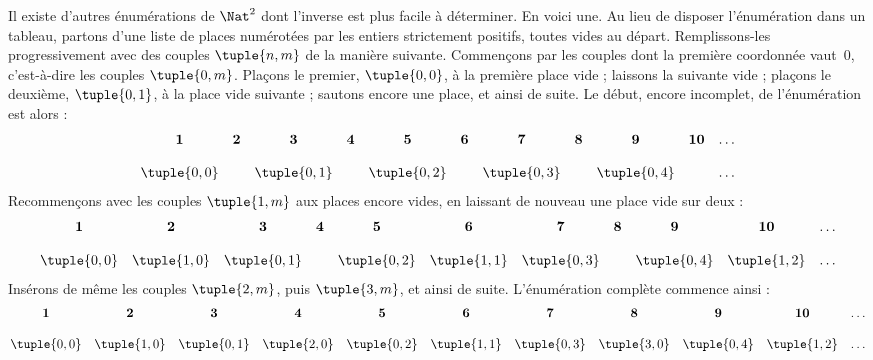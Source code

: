 \documentclass[../../../include/open-logic-section]{subfiles}
\begin{document}


\begin{explain}
Il existe d’autres énumérations de $\Nat^2$ dont l’inverse est
plus facile à déterminer. En voici une. Au lieu de disposer
l’énumération dans un tableau, partons d’une liste de places
numérotées par les entiers strictement positifs, toutes vides
au départ. Remplissons-les progressivement avec des couples
$\tuple{n,m}$ de la manière suivante. Commençons par les couples
dont la première coordonnée vaut~$0$, c’est-à-dire les couples
$\tuple{0,m}$. Plaçons le premier, $\tuple{0,0}$, à la première
place vide ; laissons la suivante vide ; plaçons le deuxième,
$\tuple{0,1}$, à la place vide suivante ; sautons encore une
place, et ainsi de suite.
%
%
Le début, encore incomplet, de l’énumération est alors :
{\small\[
\begin{array}{@{}c c c c c c c c c c c@{}}
\mathbf 1 & \mathbf 2 & \mathbf 3 & \mathbf 4 & \mathbf 5 & \mathbf 6 & \mathbf 7 & \mathbf 8 & \mathbf 9 & \mathbf{10} & \dots \\ \\
\tuple{0,0} &  & \tuple{0,1} &  & \tuple{0,2} &  & \tuple{0,3} & & \tuple{0,4} &  & \dots \\
\end{array}
\]}
Recommençons avec les couples $\tuple{1,m}$ aux places encore
vides, en laissant de nouveau une place vide sur deux :
{\small\[
\begin{array}{@{}c c c c c c c c c c c@{}}
\mathbf 1 & \mathbf 2 & \mathbf 3 & \mathbf 4 & \mathbf 5 & \mathbf 6 & \mathbf 7 & \mathbf 8 & \mathbf 9 & \mathbf{10} & \dots \\ \\
\tuple{0,0} & \tuple{1,0} & \tuple{0,1} &  & \tuple{0,2} & \tuple{1,1} &
\tuple{0,3} & & \tuple{0,4} &  \tuple{1,2} & \dots \\
\end{array}
\]}
Insérons de même les couples $\tuple{2,m}$, puis $\tuple{3,m}$,
et ainsi de suite.
%
L’énumération complète commence ainsi :
{\small\[
\begin{array}{@{}cc c c c c c c c c c@{}}
\mathbf 1 & \mathbf 2 & \mathbf 3 & \mathbf 4 & \mathbf 5 & \mathbf 6 & \mathbf 7 & \mathbf 8 & \mathbf 9 & \mathbf{10} & \dots \\ \\
\tuple{0,0} & \tuple{1,0} & \tuple{0,1} & \tuple{2,0}  & \tuple{0,2} &
\tuple{1,1} & \tuple{0,3} & \tuple{3,0}  & \tuple{0,4} &  \tuple{1,2} & \dots \\

\end{array}\]}
\end{explain}
\end{document}
